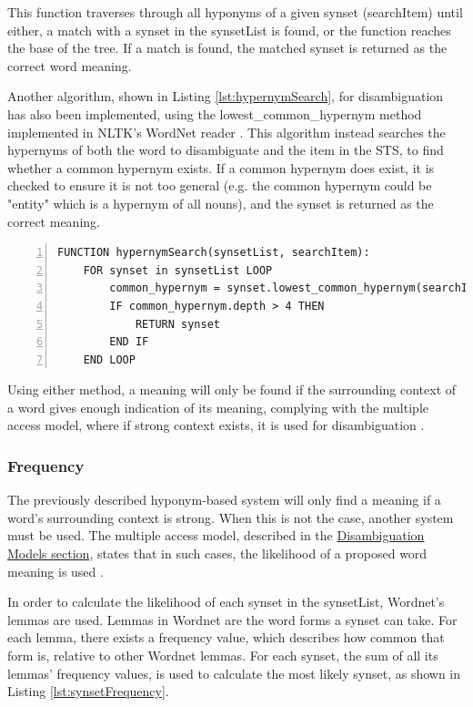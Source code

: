 \documentclass[]{article}
\begin{document}
This function traverses through all hyponyms of a given synset (searchItem) until either, a match with a synset in the synsetList is found, or the function reaches the base of the tree. If a match is found, the matched synset is returned as the correct word meaning.

Another algorithm, shown in Listing \ref{lst:hypernymSearch}, for disambiguation has also been implemented, using the lowest{\_}common{\_}hypernym method implemented in NLTK's WordNet reader \cite{NLTK}. This algorithm instead searches the hypernyms of both the word to disambiguate and the item in the STS, to find whether a common hypernym exists. If a common hypernym does exist, it is checked to ensure it is not too general (e.g. the common hypernym could be "entity" which is a hypernym of all nouns), and the synset is returned as the correct meaning.

\begin{lstlisting}[numbers=left, numberstyle=\small, caption={THE HYPERNYMSEARCH FUNCTION}, captionpos=b, label={lst:hypernymSearch}]
FUNCTION hypernymSearch(synsetList, searchItem):
    FOR synset in synsetList LOOP
        common_hypernym = synset.lowest_common_hypernym(searchItem)
        IF common_hypernym.depth > 4 THEN
            RETURN synset
       	END IF
   	END LOOP
\end{lstlisting}  

Using either method, a meaning will only be found if the surrounding context of a word gives enough indication of its meaning, complying with the multiple access model, where if strong context exists, it is used for disambiguation \cite{PsychologyOfLanguage}.

\subsubsection{Frequency}
\label{sec:DisambiguationFrequency}
The previously described hyponym-based system will only find a meaning if a word's surrounding context is strong. When this is not the case, another system must be used. The multiple access model, described in the \hyperref[sec:DisambiguationModels]{Disambiguation Models section}, states that in such cases, the likelihood of a proposed word meaning is used \cite{PsychologyOfLanguage}.

In order to calculate the likelihood of each synset in the synsetList, Wordnet's lemmas are used. Lemmas in Wordnet are the word forms a synset can take. For each lemma, there exists a frequency value, which describes how common that form is, relative to other Wordnet lemmas. For each synset, the sum of all its lemmas' frequency values, is used to calculate the most likely synset, as shown in Listing \ref{lst:synsetFrequency}.
\end{document}
